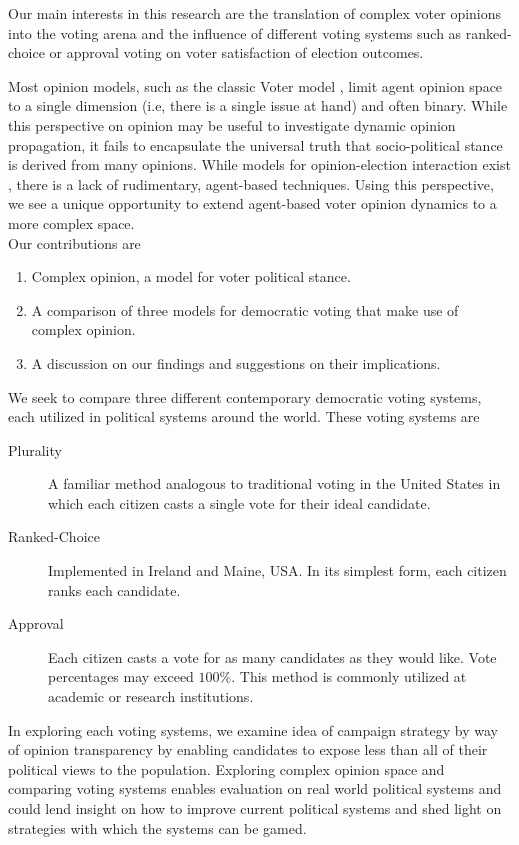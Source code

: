 \label{sec:intro}
Our main interests in this research are the translation of complex voter opinions into the voting arena and the influence of different voting systems such as ranked-choice or approval voting on voter satisfaction of election outcomes.

Most opinion models, such as the classic Voter model \cite{votermodel}, 
limit agent opinion space to a single dimension (i.e, there is a single issue at hand) and often binary.
While this perspective on opinion may be useful to investigate dynamic opinion propagation, it fails to encapsulate the 
universal truth that socio-political stance is derived from many opinions.
While models for opinion-election interaction exist \cite{hoyer1974comparing}, there is a lack of rudimentary, agent-based
techniques.
Using this perspective, we see a unique opportunity to extend agent-based voter opinion dynamics to a more complex space. \\
Our contributions are 
\begin{enumerate}
\item Complex opinion, a model for voter political stance. 
\item A comparison of three models for democratic voting that make use of complex opinion.
\item A discussion on our findings and suggestions on their implications.
\end{enumerate}
We seek to compare three different contemporary democratic voting systems, each utilized in political systems around the world.
These voting systems are 
\begin{description}
\item[Plurality] A familiar method analogous to traditional voting in the United States in which each citizen casts a 
single vote for their ideal candidate. 
\item[Ranked-Choice] Implemented in Ireland and Maine, USA. In its simplest form, each citizen ranks each candidate.
\item[Approval] Each citizen casts a vote for as many candidates as they would like. Vote percentages may exceed $100\%$.
This method is commonly utilized at academic or research institutions.
\end{description}
In exploring each voting systems, we examine idea of campaign strategy by way of opinion transparency
by enabling candidates to expose less than all of their political views to the population.\newline
\indent Exploring complex opinion space and comparing voting systems enables evaluation on real world political systems and
could lend insight on how to improve current political systems and shed light on strategies with which the systems
can be gamed. 
\\
